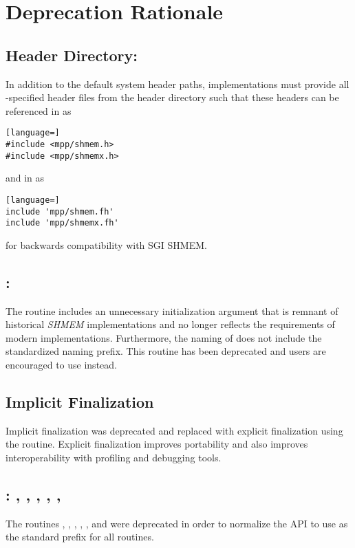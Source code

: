 \section{Deprecation Rationale}\label{subsec:dep_rationale}

\subsection{Header Directory: }
\label{subsec:dep_rationale:mpp}
In addition to the default system header paths, \openshmem implementations
must provide all \openshmem-specified header files from the 
header directory such that these headers can be referenced in \CorCpp as
\begin{lstlisting}[language=]
#include <mpp/shmem.h>
#include <mpp/shmemx.h>
\end{lstlisting}
and in \Fortran as
\begin{lstlisting}[language=]
include 'mpp/shmem.fh'
include 'mpp/shmemx.fh'
\end{lstlisting}
for backwards compatibility with \ac{SGI} SHMEM.

\subsection{\CorCpp: }
The \CorCpp routine  includes an unnecessary initialization
argument that is remnant of historical \emph{SHMEM} implementations and no
longer reflects the requirements of modern \openshmem implementations.
Furthermore, the naming of  does not include the standardized
\shmemprefixLC{} naming prefix. This routine has been deprecated and
\openshmem users are encouraged to use  instead.

\subsection{Implicit Finalization}
Implicit finalization was deprecated and replaced with explicit finalization using the
 routine.  Explicit finalization improves portability and
also improves interoperability with profiling and debugging tools.

\subsection{\CorCpp: , , ,
    , , }
The \CorCpp routines , , ,
, , and  were deprecated in order
to normalize the \openshmem \ac{API} to use \shmemprefixLC{} as the standard
prefix for all routines.

